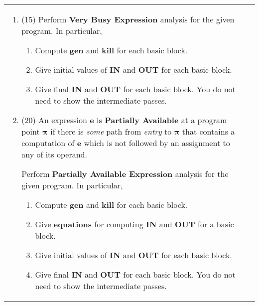 \documentclass[11pt,draft]{article}
\begin{document}
\begin{tabular}{|l|@{}l}
\begin{minipage}[t]{.63\textwidth}
\begin{enumerate}
  \item (15) Perform {\bf Very Busy Expression} analysis for the given
    program. In particular,
    \begin{enumerate}
    \item Compute {\bf gen} and {\bf kill} for each basic block.
    \item Give initial values of  {\bf IN} and {\bf OUT} for each basic block.
    \item Give final {\bf IN} and {\bf OUT} for each basic block. You do
      not need to show the intermediate passes.
    \end{enumerate}

  \item (20) An expression {\bf e} is {\bf Partially Available} at a
    program point $\mathbf{\pi}$ if there is {\em some} path from {\em
      entry} to $\mathbf{\pi}$ that contains a computation of {\bf e}
    which is not followed by an assignment to any of its operand.
    
    Perform {\bf Partially Available Expression} analysis for the
    given program. In particular,
    \begin{enumerate}
    \item Compute {\bf gen} and {\bf kill} for each basic block.
    \item Give {\bf equations} for computing {\bf IN} and {\bf OUT}
      for a basic block.
    \item Give initial values of {\bf IN} and {\bf OUT} for each basic
      block.
    \item Give final {\bf IN} and {\bf OUT} for each basic block. You
      do not need to show the intermediate passes.
    \end{enumerate}    
  \end{enumerate}
\end{minipage}\\ \cline{1-1}
\end{tabular}
\end{document}
